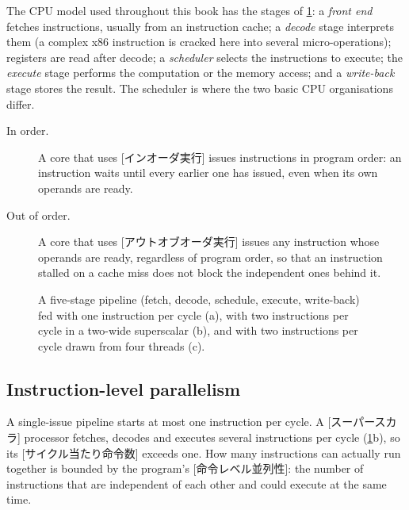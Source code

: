 \documentclass[../main.tex]{subfiles}
\begin{document}
The CPU model used throughout this book has the stages of
\cref{fig:l01-cpu-pipeline}: a \emph{front end} fetches instructions,
usually from an instruction cache; a \emph{decode} stage interprets them
(a complex x86 instruction is cracked here into several micro-operations);
registers are read after decode; a \emph{scheduler} selects the
instructions to execute; the \emph{execute} stage performs the
computation or the memory access; and a \emph{write-back} stage stores
the result.  The scheduler is where
the two basic CPU organisations differ.
\begin{description}
  \item[In order.]  A core that uses
    [インオーダ実行] issues instructions in
    program order: an instruction waits until every earlier one has
    issued, even when its own operands are ready.
  \item[Out of order.]  A core that uses
    [アウトオブオーダ実行] issues any
    instruction whose operands are ready, regardless of program order,
    so that an instruction stalled on a cache miss does not block the
    independent ones behind it.
\end{description}

\begin{figure}[htbp]
  \centering
  
  \caption{A five-stage pipeline (fetch, decode, schedule, execute,
    write-back) fed with one instruction per cycle (a), with two
    instructions per cycle in a two-wide superscalar (b), and with two
    instructions per cycle drawn from four threads (c).}
  \label{fig:l01-cpu-pipeline}
\end{figure}

\subsection{Instruction-level parallelism}

A single-issue pipeline starts at most one instruction per cycle.  A
[スーパースカラ] processor fetches, decodes and
executes several instructions per cycle (\cref{fig:l01-cpu-pipeline}b),
so its [サイクル当たり命令数]
exceeds one.  How many instructions can actually run
together is bounded by the program's
[命令レベル並列性]: the
number of instructions that are independent of each other and could
execute at the same time.
\end{document}
